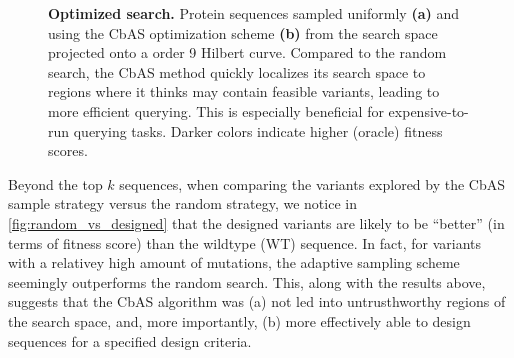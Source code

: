 \documentclass{article}
\begin{document}
\begin{figure}[htbp]
\begin{subfigure}[b]{.49\linewidth}
    \caption{}
  \end{subfigure}
  \caption{
    \textbf{Optimized search.} Protein sequences sampled uniformly \textbf{(a)}
    and using the CbAS optimization scheme \textbf{(b)} from the search space
    projected onto a order 9 Hilbert curve. Compared
    to the random search, the CbAS method quickly localizes its search space to
    regions where it thinks may contain feasible variants, leading to more
    efficient querying. This is especially beneficial for expensive-to-run
    querying tasks. Darker colors indicate higher (oracle) fitness scores.
  }
  \label{fig:landscape_hilbert}
\end{figure}

Beyond the top $k$ sequences, when comparing the variants explored by the CbAS
sample strategy versus the random strategy, we notice in
\cref{fig:random_vs_designed} that the designed variants are likely to be
``better'' (in terms of fitness score) than the wildtype (WT) sequence. In fact,
for variants with a relativey high amount of mutations, the adaptive sampling
scheme seemingly outperforms the random search. This, along with the results
above, suggests that the CbAS algorithm was (a) not led into untrusthworthy
regions of the search space, and, more importantly, (b) more effectively able to
design sequences for a specified design criteria.
\end{document}
